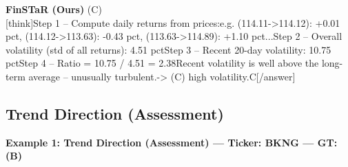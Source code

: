\begin{minipage}[t]{0.41\textwidth}
\colorbox{green!10}{\parbox{\dimexpr\textwidth-2\fboxsep}{
\textbf{FinSTaR (Ours)} \textcolor{green!50!black}{(C)} \\[2pt]
\tiny
[think]\newline Step 1 -- Compute daily returns from prices:\newline   e.g. (114.11->114.12): +0.01 pct, (114.12->113.63): -0.43 pct, (113.63->114.89): +1.10 pct\newline   ...\newline Step 2 -- Overall volatility (std of all returns): 4.51 pct\newline Step 3 -- Recent 20-day volatility: 10.75 pct\newline Step 4 -- Ratio = 10.75 / 4.51 = 2.38\newline Recent volatility is well above the long-term average -- unusually turbulent.\newline -> (C) high volatility.\newline [/think]\newline [answer]C[/answer]
}}
\vspace{-30pt}
\end{minipage}

\clearpage
\subsection{Trend Direction (Assessment)}


\noindent
\textbf{Example 1: Trend Direction (Assessment) --- Ticker: BKNG --- GT: (B)}
\vspace{2pt}


